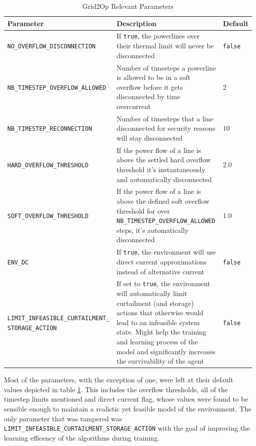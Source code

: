 \begin{table}[H] 
	\centering
	\caption{Grid2Op Relevant Parameters}
	\begin{tabular}{|p{6.5cm}|p{6cm} | p{2cm} |}
		\hline
		\textbf{Parameter} & \textbf{Description} & \textbf{Default} \\
		\hline
		\texttt{NO\_OVERFLOW\_DISCONNECTION} & If \texttt{true}, the powerlines over their thermal limit will never be disconnected & \texttt{false} \\
		\hline
		\texttt{NB\_TIMESTEP\_OVERFLOW\_ALLOWED} & Number of timesteps a powerline is allowed to be in a soft overflow before it gets disconnected by time overcurrent & 2 \\
		\hline
		\texttt{NB\_TIMESTEP\_RECONNECTION} & Number of timesteps that a line disconnected for security reasons will stay disconnected & 10 \\
		\hline
		\texttt{HARD\_OVERFLOW\_THRESHOLD} & If the power flow of a line is above the settled hard overflow threshold it's instantaneously and automatically disconnected & 2.0 \\
		\hline
		\texttt{SOFT\_OVERFLOW\_THRESHOLD} & If the power flow of a line is above the defined soft overflow threshold for over \texttt{NB\_TIMESTEP\_OVERFLOW\_ALLOWED} steps, it's automatically disconnected & 1.0 \\
		\hline
		\texttt{ENV\_DC} & If \texttt{true}, the environment will use direct current approximations instead of alternative current & \texttt{false} \\
		\hline
		\texttt{LIMIT\_INFEASIBLE\_CURTAILMENT\_ STORAGE\_ACTION} & If set to \texttt{true}, the environment will automatically limit curtailment (and storage) actions that otherwise would lead to an infeasible system state. Might help the training and learning process of the model and significantly increases the survivability of the agent & \texttt{false} \\
		\hline
	\end{tabular}
	\label{tab:grid-params}
\end{table}

Most of the parameters, with the exception of one, were left at their default values depicted in table \ref{tab:grid-params}. This includes the overflow thresholds, all of the timestep limits mentioned and direct current flag, whose values were found to be sensible enough to maintain a realistic yet feasible model of the environment. The only parameter that was tampered was \texttt{LIMIT\_INFEASIBLE\_CURTAILMENT\_STORAGE\_ACTION} with the goal of improving the learning efficency of the algorithms during training.

